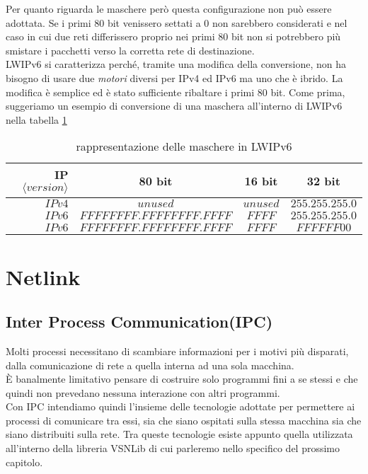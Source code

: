 Per quanto riguarda le maschere per\`o questa configurazione non pu\`o essere adottata. Se i primi 80 bit venissero settati a 0 non sarebbero considerati e nel caso in cui due reti differissero proprio nei primi 80 bit non si potrebbero pi\`u smistare i pacchetti verso la corretta rete di destinazione.\\
LWIPv6 si caratterizza perch\'e, tramite una modifica della conversione, non ha bisogno di usare due \textit{motori} diversi per IPv4 ed IPv6 ma uno che \`e ibrido. La modifica \`e semplice ed \`e stato sufficiente ribaltare i primi 80 bit. Come prima, suggeriamo un esempio di conversione di una maschera all'interno di LWIPv6 nella tabella \ref{tab:IPv4toIPv6 mask}

\begin{table}[h]                        %
\begin{center}                          %
\begin{tabular}{r|c|c|c}                  %
\hline
IP $\langle version \rangle$ & 80 bit & 16 bit & 32 bit\\
\hline  \hline        %
$IPv4$ & $unused$  &  $unused$  & $255.255.255.0$\\           %
\hline                                  %
$IPv6$ & $FFFFFFFF.FFFFFFFF.FFFF$ & $FFFF$ & $255.255.255.0$\\           %
\hline                                  %
$IPv6$ & $FFFFFFFF.FFFFFFFF.FFFF$ & $FFFF$ & $FFFFFF00$\\
\hline                           %
\end{tabular}
\caption[IPv4 to IPv6 mask conversion]{rappresentazione delle maschere in LWIPv6}\label{tab:IPv4toIPv6 mask}
\end{center}
\end{table}
\section{Netlink}
\subsection{Inter Process Communication(IPC)}
Molti processi necessitano di scambiare informazioni per i motivi pi\`u disparati, dalla comunicazione di rete a quella interna ad una sola macchina.\\
\`E banalmente limitativo pensare di costruire solo programmi fini a se stessi e che quindi non prevedano nessuna interazione con altri programmi.\\
Con IPC intendiamo quindi l'insieme delle tecnologie adottate per permettere ai processi di comunicare tra essi, sia che siano ospitati sulla stessa macchina sia che siano distribuiti sulla rete. Tra queste tecnologie esiste appunto quella utilizzata all'interno della libreria VSNLib di cui parleremo nello specifico del prossimo capitolo.
